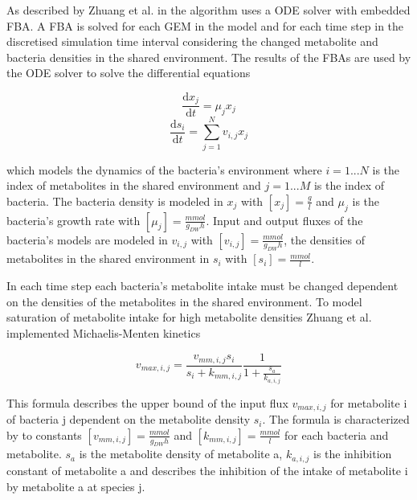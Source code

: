 As described by Zhuang et al. in \cite{zhuang_genome-scale_2011} the algorithm uses a ODE solver with embedded FBA. A FBA is solved
for each GEM in the model and for each time step in the discretised simulation time interval considering the changed metabolite and
bacteria densities in the shared environment. The results of the FBAs are used by the ODE solver to solve the differential equations

\begin{equation} \label{eq:diff_eq_x}
 \frac{\mathrm d x_j}{\mathrm d t} = \mu_j x_j
\end{equation}
\begin{equation} \label{eq:diff_eq_s}
 \frac{\mathrm d s_i}{\mathrm d t} = \displaystyle\sum_{j=1}^{N} v_{i,j} x_j
\end{equation}

which models the dynamics of the bacteria's environment \cite{zhuang_design_2012} where $i = 1...N$ is the index of metabolites in the shared environment and $j = 1...M$ is the index of bacteria.
The bacteria density is modeled in $x_j$ with $\left[ x_j \right] = \frac{g}{l}$ and $\mu_j$ is the bacteria's growth rate with $\left[ \mu_j \right] = \frac{mmol}{g_{DW} h}$.
Input and output fluxes of the bacteria's models are modeled in $v_{i,j}$ with $\left[ v_{i,j} \right] = \frac{mmol}{g_{DW} h}$,
the densities of metabolites in the shared environment in $s_i$ with $\left[ s_i \right] = \frac{mmol}{l}$.

In each time step each bacteria's metabolite intake must be changed dependent on the densities of the metabolites in the shared environment.
To model saturation of metabolite intake for high metabolite densities Zhuang et al. implemented Michaelis-Menten kinetics \cite{johnson2011original}

\begin{equation} \label{eq:michaelis-menten}
 v_{max,i,j} = \frac{v_{mm,i,j} s_i}{s_i + k_{mm,i,j}} \frac{1}{1 + \frac{s_a}{k_{a,i,j}}}
\end{equation}

This formula describes the upper bound of the input flux $v_{max,i,j}$ for metabolite i of bacteria j dependent on the metabolite density
$s_i$. The formula is characterized by to constants $\left[ v_{mm,i,j} \right] = \frac{mmol}{g_{DW} h}$ and $\left[ k_{mm,i,j} \right] = \frac{mmol}{l}$
for each bacteria and metabolite. $s_a$ is the metabolite density of metabolite a, $k_{a,i,j}$ is the inhibition constant of metabolite a and
describes the inhibition of the intake of metabolite i by metabolite a at species j.

